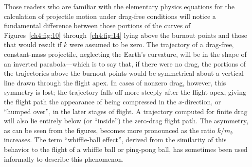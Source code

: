 Those readers who are familiar with the elementary physics equations for the calculation of
projectile motion under drag-free conditions will notice a fundamental difference between those
portions of the curves of Figures~\ref{ch4:fig:10} through~\ref{ch4:fig:14} lying above the
burnout points and those that would result if $k$ were assumed to be zero. The trajectory of a
drag-free, constant-mass projectile, neglecting the Earth's curvature, will be in the shape of an
inverted parabola---which is to say that, if there were no drag, the portions of the trajectories
above the burnout points would be symmetrical about a vertical line drawn through the flight apex.
In cases of nonzero drag, however, this symmetry is lost; the trajectory falls off more steeply
after the flight apex, giving the flight path the appearance of being compressed in the
$x$-direction, or ``humped over'', in the later stages of flight. A trajectory computed for finite
drag will also lie entirely below (or ``inside'') the zero-drag flight path.
The asymmetry, as can be seen from the figures, becomes more pronounced as the ratio $k/m_b$
increases. The term ``whiffle-ball effect'', derived from the similarity of this behavior to the
flight of a whiffle ball or ping-pong ball, has sometimes been used informally to describe this
phenomenon.
